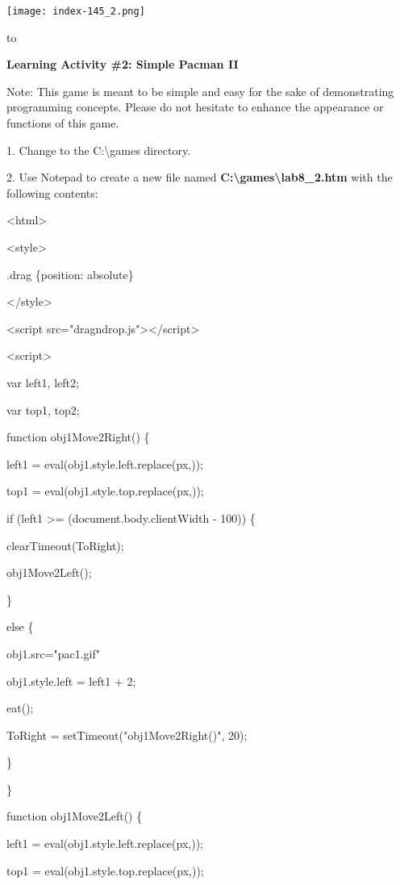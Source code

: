 \documentclass[
]{article}
\begin{document}
\texttt{[image: index-145\_2.png]}

to

\textbf{Learning Activity \#2: Simple Pacman II}

Note: This game is meant to be simple and easy for the sake of
demonstrating programming concepts. Please do not hesitate to enhance
the appearance or functions of this game.

1. Change to the C:\textbackslash games directory.

2. Use Notepad to create a new file named
\textbf{C:\textbackslash games\textbackslash lab8\_2.htm} with the
following contents:

\textless html\textgreater{}

\textless style\textgreater{}

.drag \{position: absolute\}

\textless/style\textgreater{}

\textless script
src="dragndrop.js"\textgreater\textless/script\textgreater{}

\textless script\textgreater{}

var left1, left2;

var top1, top2;

function obj1Move2Right() \{

left1 =
eval(obj1.style.left.replace(\textquotesingle px\textquotesingle,\textquotesingle\textquotesingle));

top1 =
eval(obj1.style.top.replace(\textquotesingle px\textquotesingle,\textquotesingle\textquotesingle));

if (left1 \textgreater= (document.body.clientWidth - 100)) \{

clearTimeout(ToRight);

obj1Move2Left();

\}

else \{

obj1.src="pac1.gif"

obj1.style.left = left1 + 2;

eat();

ToRight = setTimeout("obj1Move2Right()", 20);

\}

\}

function obj1Move2Left() \{

left1 =
eval(obj1.style.left.replace(\textquotesingle px\textquotesingle,\textquotesingle\textquotesingle));

top1 =
eval(obj1.style.top.replace(\textquotesingle px\textquotesingle,\textquotesingle\textquotesingle));
\end{document}
